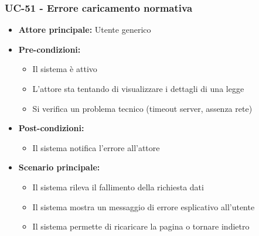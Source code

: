 \documentclass[a4paper,12pt]{article}
\begin{document}
\subsubsection{UC-51 - Errore caricamento normativa} \label{subsec:UC-51}
\begin{itemize}
    \item \textbf{Attore principale:} Utente generico
    \item \textbf{Pre-condizioni:}
    \begin{itemize}
        \item Il sistema è attivo
        \item L'attore sta tentando di visualizzare i dettagli di una legge
        \item Si verifica un problema tecnico (timeout server, assenza rete)
    \end{itemize}
    \item \textbf{Post-condizioni:}
    \begin{itemize}
        \item Il sistema notifica l'errore all'attore
    \end{itemize}
    \item \textbf{Scenario principale:} 
    \begin{itemize}
        \item Il sistema rileva il fallimento della richiesta dati
        \item Il sistema mostra un messaggio di errore esplicativo all'utente
        \item Il sistema permette di ricaricare la pagina o tornare indietro
    \end{itemize}
\end{itemize}
\end{document}
